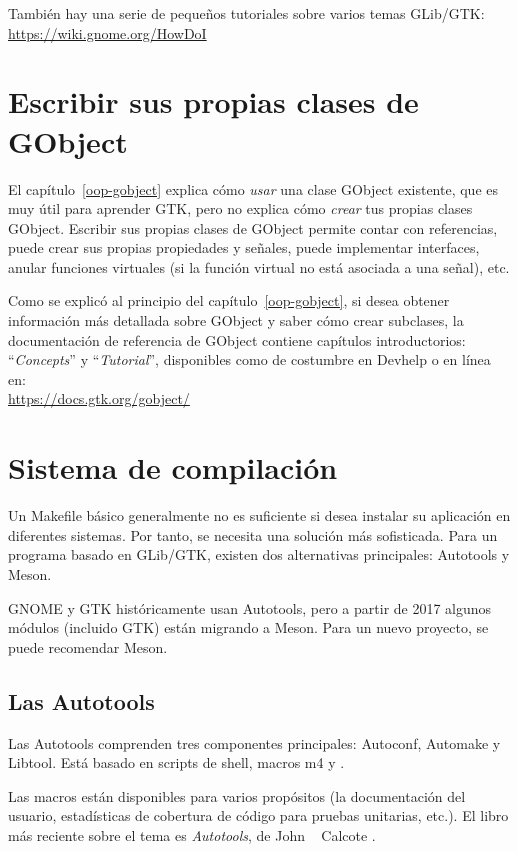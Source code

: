 También hay una serie de pequeños tutoriales sobre varios temas GLib/GTK: \\
\url{https://wiki.gnome.org/HowDoI}

\section{Escribir sus propias clases de GObject}

El capítulo~\ref{oop-gobject} explica cómo \emph{usar} una clase GObject existente, que es muy útil para aprender GTK, pero no explica cómo \emph{crear} tus propias clases GObject. Escribir sus propias clases de GObject permite contar con referencias, puede crear sus propias propiedades y señales, puede implementar interfaces, anular funciones virtuales (si la función virtual no está asociada a una señal), etc.

Como se explicó al principio del capítulo~\ref{oop-gobject}, si desea obtener información más detallada sobre GObject y saber cómo crear subclases, la documentación de referencia de GObject contiene capítulos introductorios: ``\emph{Concepts}'' y ``\emph{Tutorial}'', disponibles como de costumbre en Devhelp o en línea en: \\
\url{https://docs.gtk.org/gobject/}

\section{Sistema de compilación}

Un Makefile básico generalmente no es suficiente si desea instalar su aplicación en diferentes sistemas. Por tanto, se necesita una solución más sofisticada. Para un programa basado en GLib/GTK, existen dos alternativas principales: Autotools y Meson.

GNOME y GTK históricamente usan Autotools, pero a partir de 2017 algunos módulos (incluido GTK) están migrando a Meson. Para un nuevo proyecto, se puede recomendar Meson.

\subsection{Las Autotools}

Las Autotools comprenden tres componentes principales: Autoconf, Automake y Libtool. Está basado en scripts de shell, macros m4 y .

Las macros están disponibles para varios propósitos (la documentación del usuario, estadísticas de cobertura de código para pruebas unitarias, etc.). El libro más reciente sobre el tema es \emph{Autotools}, de John ~ Calcote \cite{autotools}.

